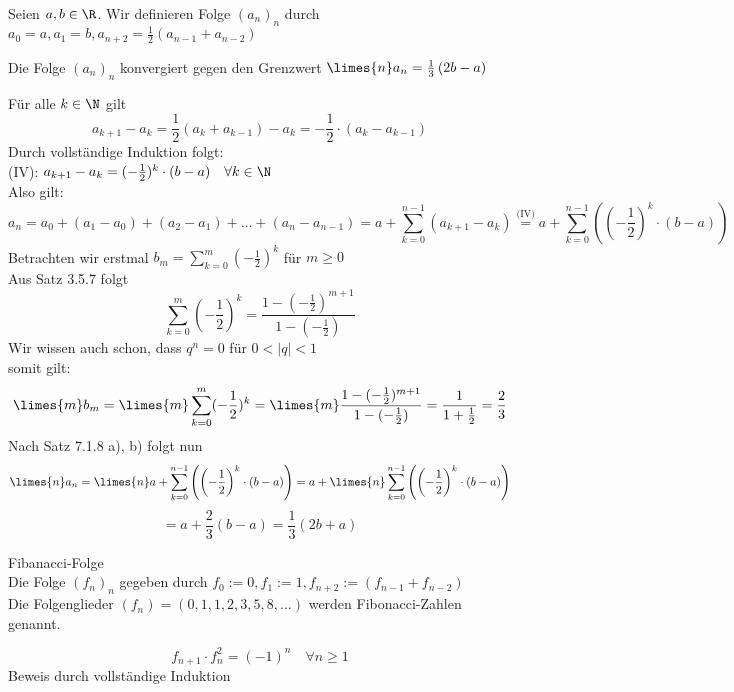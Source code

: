 \documentclass[12pt,a4paper,titlepage,draft]{article}
\begin{document}
	\begin{bsp} 
		Seien \(a, b \in \R\). Wir definieren Folge \((a_n)_n\) durch \(a_0 = a, a_1 = b, a_{n+2} = \frac{1}{2}\left(a_{n-1} + a_{n-2}\right)\)\\
		\begin{beh}
			Die Folge \((a_n)_n\) konvergiert gegen den Grenzwert \(\limes{n} a_n = \frac{1}{3}\left(2b - a\right)\)
		\end{beh}
		\begin{bew}
			Für alle \(k \in \N\) gilt
			\[a_{k+1} - a_k = \frac{1}{2}\left(a_{k} + a_{k-1}\right) - a_k = -\frac{1}{2} \cdot (a_k - a_{k-1})\]
			Durch vollständige Induktion folgt:\\
			(IV): \(a_{k+1} - a_k =  (-\frac{1}{2})^k \cdot (b - a) \quad \forall k \in \N\)\\
			Also gilt:
			\[a_n = a_0 + (a_1 - a_0) + (a_2 - a_1) + \dots + (a_n - a_{n-1}) = a + \sum_{k=0}^{n-1}(a_{k+1} - a_k) \overset{\text{(IV)}}{=} a + \sum_{k=0}^{n-1} \left(\left(-\frac{1}{2}\right)^k \cdot (b - a)\right)\]
			Betrachten wir erstmal \(b_m = \sum_{k=0}^{m} (-\frac{1}{2})^k\) für \(m \geq 0\)\\
			Aus Satz 3.5.7 folgt
			\[\sum_{k=0}^{m} (-\frac{1}{2})^k = \frac{1-(-\frac{1}{2})^{m+1}}{1-(-\frac{1}{2})}\]
			Wir wissen auch schon, dass \(q^n = 0\) für \(0 < |q| < 1\)\\
			somit gilt:
			\[\limes{m} b_m = \limes{m} \sum_{k=0}^{m} (-\frac{1}{2})^k = \limes{m} \frac{1-(-\frac{1}{2})^{m+1}}{1-(-\frac{1}{2})} = \frac{1}{1 + \frac{1}{2}} = \frac{2}{3}\]
			Nach Satz 7.1.8 a), b) folgt nun
			\[\limes{n} a_n = \limes{n} a + \sum_{k=0}^{n-1} \left(\left(-\frac{1}{2}\right)^k \cdot (b - a)\right) = a + \limes{n} \sum_{k=0}^{n-1} \left(\left(-\frac{1}{2}\right)^k \cdot (b - a)\right)\]
			\[= a + \frac{2}{3}(b - a) = \frac{1}{3}(2b + a)\]
		\end{bew}
	\end{bsp}
	\begin{defi}
		Fibanacci-Folge\\
		Die Folge \((f_n)_n\) gegeben durch \(f_0 := 0, f_1 := 1, f_{n+2} := (f_{n-1} + f_{n-2})\)\\
		Die Folgenglieder \((f_n) = (0, 1, 1, 2, 3, 5, 8, \dots)\) werden Fibonacci-Zahlen genannt.
	\end{defi}
	\begin{beh}[1]
		\[f_{n+1} \cdot f_n^2 = (-1)^n \quad \forall n \geq 1\]
		Beweis durch vollständige Induktion
	\end{beh}
\end{document}

